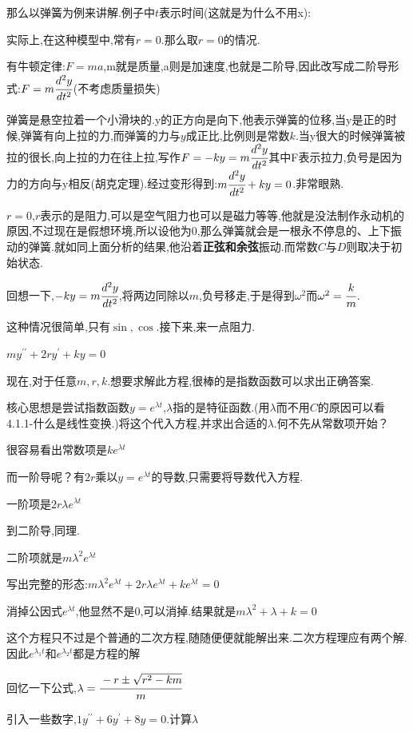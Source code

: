 \documentclass[UTF8,12pt]{ctexbook}
\newcommand{\derivative}{^\prime}
\newcommand{\doubleDerivative}{^{\prime\prime}}
\begin{document}
{{{{那么以弹簧为例来讲解.例子中$t$表示时间(这就是为什么不用x):

实际上,在这种模型中,常有$r = 0$.那么取$ r = 0$的情况.

有牛顿定律:$F = ma$,m就是质量,a则是加速度,也就是二阶导,因此改写成二阶导形式:$F = m\cfrac{d^2y}{dt^2}$(不考虑质量损失)

弹簧是悬空拉着一个小滑块的.y的正方向是向下,他表示弹簧的位移,当y是正的时候,弹簧有向上拉的力,而弹簧的力与$y$成正比,比例则是常数$k$.当y很大的时候弹簧被拉的很长,向上拉的力在往上拉,写作$F = -ky = m\cfrac{d^2y}{dt^2}$其中F表示拉力,负号是因为力的方向与y相反(胡克定理).经过变形得到:$m\cfrac{d^2y}{dt^2} + ky = 0$.非常眼熟.

$r = 0$,$r$表示的是阻力,可以是空气阻力也可以是磁力等等,他就是没法制作永动机的原因,不过现在是假想环境,所以设他为0,那么弹簧就会是一根永不停息的、上下振动的弹簧.就如同上面分析的结果,他沿着{\bfseries 正弦和余弦}振动.而常数$C$与$D$则取决于初始状态.

回想一下,$-ky = m\cfrac{d^2y}{dt^2}$,将两边同除以$m$,负号移走,于是得到$\omega^2$而$\omega^2 = \cfrac{k}{m}$.

这种情况很简单,只有$\sin , \cos$.接下来,来一点阻力.

$my\doubleDerivative + 2ry\derivative + ky = 0$

现在,对于任意$m,r,k$.想要求解此方程,很棒的是指数函数可以求出正确答案.

核心思想是尝试指数函数$y = e^{\lambda t}$,$\lambda$指的是特征函数.(用$\lambda$而不用$C$的原因可以看4.1.1-什么是线性变换.)将这个代入方程,并求出合适的$\lambda$.何不先从常数项开始？

很容易看出常数项是$ke^{\lambda t}$

而一阶导呢？有$2r$乘以$y = e^{\lambda t}$的导数,只需要将导数代入方程.

一阶项是$2r\lambda e^{\lambda t}$

到二阶导,同理.

二阶项就是$m\lambda^2e^{\lambda t}$

写出完整的形态:$m\lambda^2e^{\lambda t} + 2r\lambda e^{\lambda t} + ke^{\lambda t} = 0$

消掉公因式$e^{\lambda t}$,他显然不是0,可以消掉.结果就是$m\lambda^2 + \lambda + k= 0$

这个方程只不过是个普通的二次方程,随随便便就能解出来.二次方程理应有两个解.因此$e^{\lambda_1 t}$和$e^{\lambda_2 t}$都是方程的解

回忆一下公式,$\lambda = \cfrac{-r \pm \sqrt{r^2 - km}}{m}$

引入一些数字,$1y\doubleDerivative + 6y\derivative + 8y = 0$.计算$\lambda$

}}}}
\end{document}
